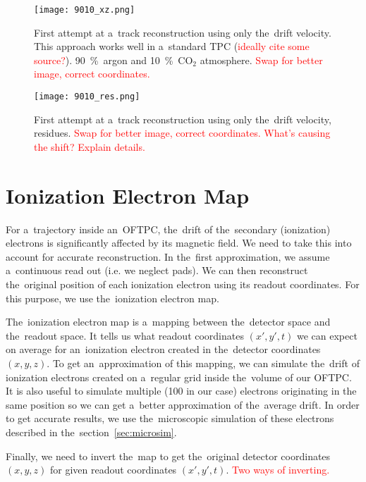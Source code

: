 		\begin{figure}
			\centering
			\texttt{[image: 9010\_xz.png]}
			\caption{First attempt at a~track reconstruction using only the~drift velocity. This approach works well in a~standard \ac{TPC} (\textcolor{red}{ideally cite some source?}). 90~\%~argon and 10~\%~CO$_2$ atmosphere. \textcolor{red}{Swap for better image, correct coordinates.}}
			\label{fig:9010xz}
		\end{figure}
		
		\begin{figure}
			\centering
			\texttt{[image: 9010\_res.png]}
			\caption{First attempt at a~track reconstruction using only the~drift velocity, residues. \textcolor{red}{Swap for better image, correct coordinates. What's causing the shift? Explain details.}}
			\label{fig:9010res}
		\end{figure}
	
	\section{Ionization Electron Map}
	\label{sec:map}
		For a~trajectory inside an~\ac{OFTPC}, the~drift of the~secondary (ionization) electrons is significantly affected by its magnetic field. We need to take this into account for accurate reconstruction. In the~first approximation, we assume a~continuous read out (i.e. we neglect pads). We can then reconstruct the~original position of each ionization electron using its readout coordinates. For this purpose, we use the~ionization electron map.
		
		The~ionization electron map is a~mapping between the~detector space and the~readout space. It tells us what readout coordinates $(x',y',t)$ we can expect on average for an~ionization electron created in the~detector coordinates $(x,y,z)$. To get an~approximation of this mapping, we can simulate the~drift of ionization electrons created on a~regular grid inside the~volume of our \ac{OFTPC}. It is also useful to simulate multiple (100 in our case) electrons originating in the same position so we can get a~better approximation of the~average drift. In order to get accurate results, we use the~microscopic simulation of these electrons described in the~section~\ref{sec:microsim}.
		
		Finally, we need to invert the~map to get the~original detector coordinates $(x,y,z)$ for given readout coordinates $(x',y',t)$. \textcolor{red}{Two ways of inverting.}
		
